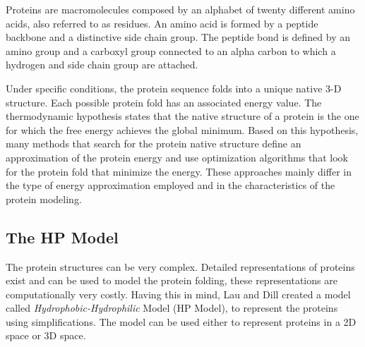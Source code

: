 \documentclass[conference]{IEEEtran}
\begin{document}
Proteins are macromolecules composed by an alphabet of twenty different amino acids, also referred to as residues. An amino acid is formed by a peptide backbone and a distinctive side chain group. The peptide bond is defined by an amino group and a carboxyl group connected to an alpha carbon to which a hydrogen and side chain group are attached.




Under specific conditions, the protein sequence folds into a unique native 3-D structure. Each possible protein fold has an associated energy value. The thermodynamic hypothesis states that the native structure of a protein is the one for which the free energy achieves the global minimum. Based on this hypothesis, many methods \cite{custodio2004investigation, hsu2003growth, krasnogor2002multimeme, lin2011protein, unger1993genetic} that search for the protein native structure define an approximation of the protein energy and use optimization algorithms that look for the protein fold that minimize the energy. These approaches mainly differ in the type of energy approximation employed and in the characteristics of the protein modeling.


\subsection{The HP Model} \label{sec:hpModel}


The protein structures can be very complex. Detailed representations of proteins exist	 and can be used to model the protein folding, these representations are computationally very costly. Having this in mind, Lau and Dill \cite{lau1989lattice} created a model called \textit{Hydrophobic-Hydrophilic} Model (HP Model), to represent the proteins using simplifications. The model can be used either to represent proteins in a 2D space or 3D space.
\end{document}
